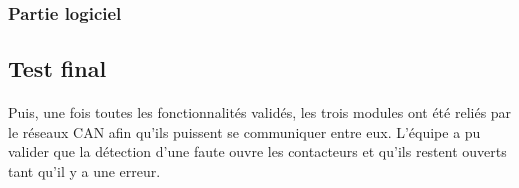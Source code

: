 		\subsubsection{Partie logiciel}	
		
			\paragraph{}		
			
			
	\subsection{Test final}
	
		\paragraph{}
		Puis, une fois toutes les fonctionnalités validés, les trois modules ont été reliés par le réseaux CAN afin qu’ils puissent se communiquer entre eux. L’équipe a pu valider que la détection d’une faute ouvre les contacteurs et qu’ils restent ouverts tant qu’il y a une erreur.
		